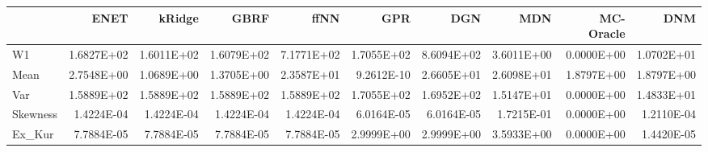 \begin{tabular}{lrrrrrrrrr}
\toprule
{} &       ENET &     kRidge &       GBRF &       ffNN &        GPR &        DGN &        MDN &  MC-Oracle &        DNM \\
\midrule
W1       & 1.6827E+02 & 1.6011E+02 & 1.6079E+02 & 7.1771E+02 & 1.7055E+02 & 8.6094E+02 & 3.6011E+00 & 0.0000E+00 & 1.0702E+01 \\
Mean     & 2.7548E+00 & 1.0689E+00 & 1.3705E+00 & 2.3587E+01 & 9.2612E-10 & 2.6605E+01 & 2.6098E+01 & 1.8797E+00 & 1.8797E+00 \\
Var      & 1.5889E+02 & 1.5889E+02 & 1.5889E+02 & 1.5889E+02 & 1.7055E+02 & 1.6952E+02 & 1.5147E+01 & 0.0000E+00 & 1.4833E+01 \\
Skewness & 1.4224E-04 & 1.4224E-04 & 1.4224E-04 & 1.4224E-04 & 6.0164E-05 & 6.0164E-05 & 1.7215E-01 & 0.0000E+00 & 1.2110E-04 \\
Ex\_Kur   & 7.7884E-05 & 7.7884E-05 & 7.7884E-05 & 7.7884E-05 & 2.9999E+00 & 2.9999E+00 & 3.5933E+00 & 0.0000E+00 & 1.4420E-05 \\
\bottomrule
\end{tabular}
